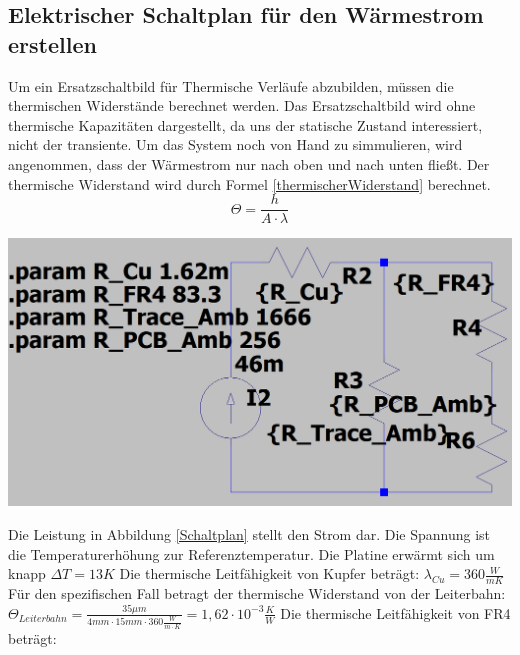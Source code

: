 \documentclass[10pt,a4paper,oneside,abstracton]{scrartcl}
\newenvironment{Figure}
  {\par\medskip\noindent\minipage{\linewidth}}
  {\endminipage\par\medskip}
\begin{document}
\begin{multicols}{2}
\subsection*{Elektrischer Schaltplan für den Wärmestrom erstellen}
Um ein Ersatzschaltbild für Thermische Verläufe abzubilden, müssen die thermischen Widerstände berechnet werden. 
Das Ersatzschaltbild wird ohne thermische Kapazitäten dargestellt, da uns der statische Zustand interessiert, nicht der transiente.
Um das System noch von Hand zu simmulieren, wird angenommen, dass der Wärmestrom nur nach oben und nach unten fließt. 
Der thermische Widerstand wird durch Formel \ref*{thermischerWiderstand} berechnet. 
\begin{equation}
	\Theta =  \frac{h}{A \cdot \lambda}
	\label{thermischerWiderstand}
\end{equation}
\noindent
\begin{Figure}
	\includegraphics[width=\textwidth]{Bilder/Schaltplan.png}
	\label{Schaltplan}
\end{Figure}
\noindent
Die Leistung in Abbildung \ref{Schaltplan} stellt den Strom dar. Die Spannung ist die Temperaturerhöhung zur Referenztemperatur. 
Die Platine erwärmt sich um knapp $\Delta T = 13K$
Die thermische Leitfähigkeit von Kupfer beträgt:  \newline 
$\lambda_{Cu} = 360 \frac{W}{m K}$  \cite{Waermefluss} \newline
Für den spezifischen Fall betragt der thermische Widerstand von der Leiterbahn:  \newline
$\Theta_{Leiterbahn} = \frac{35 \mu m}{4mm \cdot 15mm \cdot 360 \frac{W}{m\cdot K}} = 1,62\cdot 10^{-3} \frac{K}{W}$
\newline 
Die thermische Leitfähigkeit von FR4 beträgt: 
\newline

\end{multicols}
\end{document}
